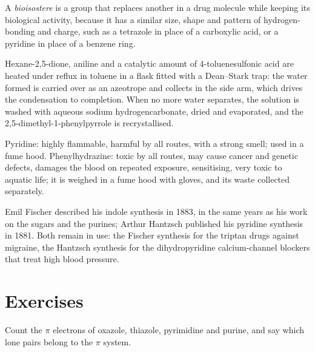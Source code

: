 \begin{definition}[Bioisostere]\label{def:b3:heterocycles:bioisostere}
A \emph{bioisostere} is a group that replaces another in a
drug molecule while keeping its biological activity, because it has a similar
size, shape and pattern of hydrogen-bonding and charge, such as a tetrazole in
place of a carboxylic acid, or a pyridine in place of a benzene ring.
\end{definition}

\begin{inthelab}
Hexane-2,5-dione, aniline and a catalytic amount of 4-toluenesulfonic acid are
heated under reflux in toluene in a flask fitted with a Dean--Stark trap: the
water formed is carried over as an azeotrope and collects in the side arm, which
drives the condensation to completion. When no more water separates, the
solution is washed with aqueous sodium hydrogencarbonate, dried and evaporated,
and the 2,5-dimethyl-1-phenylpyrrole is recrystallised.
\end{inthelab}

\begin{safety}{}
Pyridine: highly flammable, harmful by all routes, with a strong smell; used in a
fume hood. Phenylhydrazine: toxic by all routes, may cause cancer and genetic
defects, damages the blood on repeated exposure, sensitising, very toxic to
aquatic life; it is weighed in a fume hood with gloves, and its waste collected
separately.
\end{safety}

\begin{history}
Emil Fischer described his indole synthesis in 1883, in the same years as his
work on the sugars and the purines; Arthur Hantzsch published his pyridine
synthesis in 1881. Both remain in use: the Fischer synthesis for the
triptan drugs against migraine, the Hantzsch synthesis for the dihydropyridine
calcium-channel blockers that treat high blood pressure.
\end{history}

\section{Exercises}

\begin{exercise}[$\star$]\label{exo:b3:heterocycles:1}
Count the $\pi$ electrons of oxazole, thiazole, pyrimidine and purine, and say which
lone pairs belong to the $\pi$ system.
\end{exercise}

